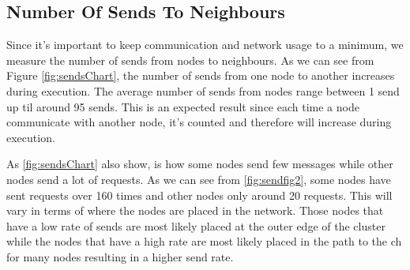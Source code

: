 \documentclass[USenglish]{uit-thesis}
\begin{document}
\newpage 

\subsection{Number Of Sends To Neighbours}
Since it's important to keep communication and network usage to a minimum, we measure the number of sends from nodes to neighbours. 
As we can see from Figure \ref{fig:sendsChart}, the number of sends from one node to another increases during execution. The average number of sends from nodes range between 1 send up til around 95 sends. This is an expected result since each time a node communicate with another node, it's counted and therefore will increase during execution.

As \autoref{fig:sendsChart} also show, is how some nodes send few messages while other nodes send a lot of requests. As we can see from \autoref{fig:sendfig2}, some nodes have sent requests over 160 times and other nodes only around 20 requests. This will vary in terms of where the nodes are placed in the network. Those nodes that have a low rate of sends are most likely placed at the outer edge of the cluster while the nodes that have a high rate are most likely placed in the path to the \gls{ch} for many nodes resulting in a higher send rate.


\end{document}
